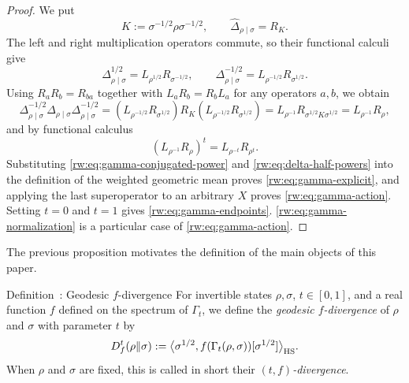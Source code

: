 \documentclass[11pt]{article}
\theoremstyle{remark}
\newcommand{\1}{\mathbbm{1}}
\begin{document}
\begin{proof}
We put
\begin{equation}
 K:=\sigma^{-1/2}\rho\sigma^{-1/2},
 \qquad
 \widehat\Delta_{\rho\mid\sigma}=R_K.
\end{equation}
The left and right multiplication operators commute, so their
functional calculi give
\begin{equation}
 \Delta_{\rho\mid\sigma}^{1/2}
 =L_{\rho^{1/2}}R_{\sigma^{-1/2}},
 \qquad
 \Delta_{\rho\mid\sigma}^{-1/2}
 =L_{\rho^{-1/2}}R_{\sigma^{1/2}}.
 \label{rw:eq:delta-half-powers}
\end{equation}
Using $ R_aR_b=R_{ba}$ together with $L_aR_b=R_bL_a$ for any operators $a,b$, we obtain
\begin{equation}
\Delta_{\rho\mid\sigma}^{-1/2}
  \widehat\Delta_{\rho\mid\sigma}
  \Delta_{\rho\mid\sigma}^{-1/2}=
 (L_{\rho^{-1/2}}R_{\sigma^{1/2}})
 R_K
(L_{\rho^{-1/2}}R_{\sigma^{1/2}})=L_{\rho^{-1}}
 R_{\sigma^{1/2}K\sigma^{1/2}}
 =L_{\rho^{-1}}R_\rho, 
\label{rw:eq:gamma-conjugated-endpoint}
\end{equation}
and by functional calculus
\begin{equation}
 (L_{\rho^{-1}}R_\rho)^t
 =L_{\rho^{-t}}R_{\rho^t}.
 \label{rw:eq:gamma-conjugated-power}
\end{equation}
Substituting \eqref{rw:eq:gamma-conjugated-power} and
\eqref{rw:eq:delta-half-powers} into the definition of the weighted
geometric mean proves \eqref{rw:eq:gamma-explicit}, and applying the last
superoperator to an arbitrary $X$ proves \eqref{rw:eq:gamma-action}.
Setting $t=0$ and $t=1$ gives \eqref{rw:eq:gamma-endpoints}. \eqref{rw:eq:gamma-normalization} is a particular case of 
\eqref{rw:eq:gamma-action}.
\end{proof}

The previous proposition motivates the definition of the main objects of this paper. 

\label{rw:def:interpolated-f-divergence}
\begin{mainobject}{Definition~\thedefinition: Geodesic
$f$-divergence}
For invertible states $\rho,\sigma$, $t\in[0,1]$, and a real
function $f$ defined on the spectrum of $\Gamma_t$, we define the \emph{geodesic $f$-divergence} of $\rho$ and $\sigma$ with parameter $t$ by
\begin{equation}
 D_f^t(\rho\Vert\sigma)
 :=\big\langle\sigma^{1/2},
 f(\Gamma_t(\rho,\sigma))[\sigma^{1/2}]
 \big\rangle_{\rm HS}.
 \label{rw:eq:interpolated-f-divergence}
\end{equation}
When $\rho$ and $\sigma$ are fixed, this is called in short their \textit{$(t,f)$-divergence}.
\end{mainobject}
\end{document}
